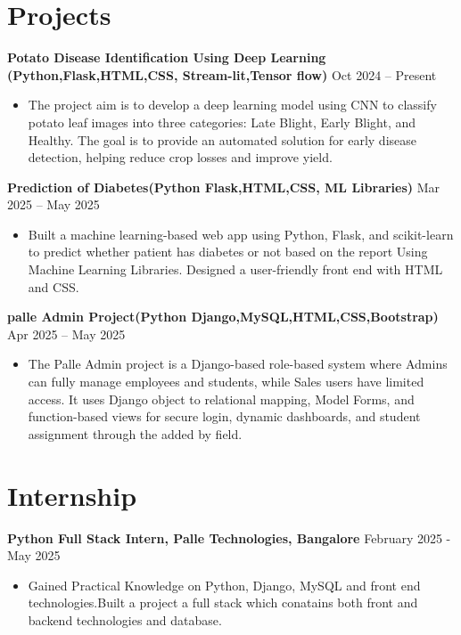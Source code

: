 \documentclass[a4paper,10pt]{article}
\begin{document}
\section{Projects}

\textbf{Potato Disease Identification Using Deep Learning (Python,Flask,HTML,CSS, Stream-lit,Tensor flow)} \hfill Oct 2024 -- Present \\
\begin{itemize}[leftmargin=0.5cm]
    \item The project aim is to develop a deep learning model using CNN to classify potato leaf images into three categories: Late Blight, Early Blight, and Healthy. The goal is to provide an automated solution for early disease detection, helping reduce crop losses and improve yield.  
\end{itemize}

\textbf{Prediction of Diabetes(Python Flask,HTML,CSS, ML Libraries)} \hfill Mar 2025 --  May 2025 \\
\begin{itemize}[leftmargin=0.5cm]
    \item Built a machine learning-based web app using Python, Flask, and scikit-learn to predict whether patient has diabetes or not based on the report Using Machine Learning Libraries. Designed a user-friendly front end with HTML and CSS.
\end{itemize}

\textbf { palle Admin Project(Python Django,MySQL,HTML,CSS,Bootstrap)} \hfill Apr 2025 --  May 2025 \\
\begin{itemize}[leftmargin=0.5cm]
    \item The Palle Admin project is a Django-based role-based system where Admins can fully manage employees and students, while Sales users have limited access. It uses Django object to relational mapping, Model Forms, and function-based views for secure login, dynamic dashboards, and student assignment through the added by field. 
\end{itemize}

\section{Internship}

\textbf{Python Full Stack Intern, Palle Technologies, Bangalore} \hfill February 2025 - May 2025 \\
\begin{itemize}[leftmargin=0.5cm]
    \item Gained Practical Knowledge on Python, Django, MySQL and front end technologies.Built a project a full stack which conatains both front and backend technologies and database. 
\end{itemize}
\end{document}
